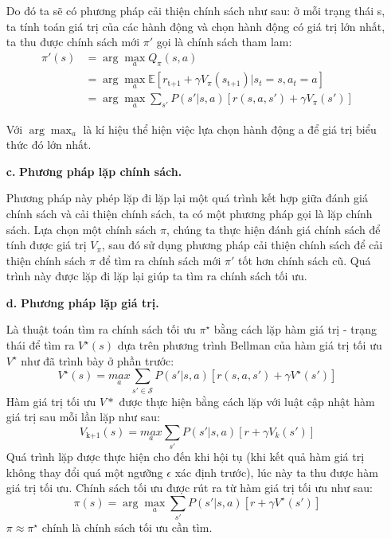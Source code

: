 \documentclass{uetgraduation}
\begin{document}
\begin{itemize}
    Do đó ta sẽ có phương pháp cải thiện chính sách như sau: ở mỗi trạng thái s, ta tính toán giá trị của các hành động và chọn hành động có giá trị lớn nhất, ta thu được chính sách mới
    $\pi'$ gọi là chính sách tham lam:
    \begin{align*}
        \pi' (s) &= \arg \max_{a} Q_\pi (s, a) \\
        &= \arg \max_{a} \mathbb{E} [r_\text{t+1} + \gamma V_\pi (s_\text{t+1}) | s_t = s, a_t = a] \\
        &= \arg \max_{a} \sum_{s'} P(s' | s, a) [r(s, a, s') + \gamma V_\pi(s')]
    \end{align*}

    Với $\arg \max_{a}$ là kí hiệu thể hiện việc lựa chọn hành động a để giá trị biểu thức đó lớn nhất.

    \item[\textbf{c.}] \textbf{Phương pháp lặp chính sách.}
    
    Phương pháp này phép lặp đi lặp lại một quá trình kết hợp giữa đánh giá chính sách và cải thiện chính sách, ta có một phương pháp gọi là lặp chính sách. Lựa chọn một chính sách $\pi$, chúng ta thực hiện đánh giá chính sách để tính được
    giá trị $V_\pi$, sau đó sử dụng phương pháp cải thiện chính sách để cải thiện chính sách $\pi$ để tìm ra chính sách mới $\pi'$ tốt hơn chính sách cũ. Quá trình này được lặp đi lặp lại giúp ta tìm ra chính sách tối ưu.

    \item[\textbf{d.}] \textbf{Phương pháp lặp giá trị.}
    
    Là thuật toán tìm ra chính sách tối ưu $\pi^\star$ bằng cách lặp hàm giá trị - trạng thái để tìm ra $V^\star (s)$ dựa trên phương trình Bellman của hàm giá trị tối ưu $V^\star$ như đã trình bày
    ở phần trước:
    \[
    V^\star (s) = \underset{a}{max } \sum_{s' \in \mathcal{S}} P(s' | s, a) [r(s, a, s') + \gamma V^\star (s')]
    \]
    Hàm giá trị tối ưu $V*$ được thực hiện bằng cách lặp với luật cập nhật hàm giá trị sau mỗi lần lặp như sau:
    \[
    V_\text{k+1} (s) = \underset{a}{max } \sum_{s'} P(s' | s, a) [r + \gamma V_k (s')]
    \]
    Quá trình lặp được thực hiện cho đến khi hội tụ (khi kết quả hàm giá trị không thay đổi quá một ngưỡng $\epsilon$ xác định trước), lúc này ta thu được hàm giá trị
    tối ưu. Chính sách tối ưu được rút ra từ hàm giá trị tối ưu như sau:
    \[
    \pi (s) = \arg \max_a \sum_{s'} P(s'|s, a) [r + \gamma V^\star (s')]
    \]
    $\pi \approx \pi^\star$ chính là chính sách tối ưu cần tìm.
    
\end{itemize}
\end{document}
